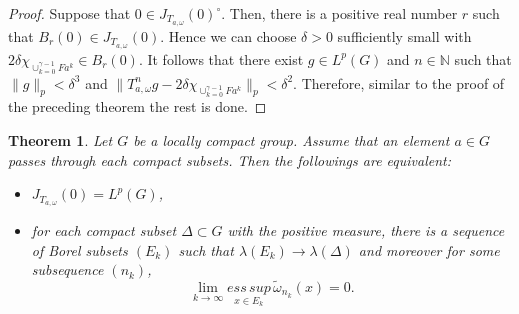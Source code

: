 \documentclass{amsart}
\newtheorem{thm}{Theorem}[section]
\theoremstyle{definition}\newtheorem{defn}[thm]{Definition}
\theoremstyle{remark}
\numberwithin{equation}{section}
\begin{document}
\begin{proof}
Suppose that  $0\in J_{T_{a,\omega}}(0)^\circ$. Then, there is a
positive real number $r$ such that $B_{r}(0)\in
J_{T_{a,\omega}}(0)$. Hence we can choose $\delta>0$ sufficiently
small with $2\delta\chi_{\cup_{k=0}^{\gamma-1}Fa^k}\in B_{r}(0)$. It
follows that there exist $g\in L^p(G)$ and $n\in\mathbb{N}$ such
that $\|g\|_p<\delta^3$ and
$\|T^n_{a,\omega}g-2\delta\chi_{\cup_{k=0}^{\gamma-1}Fa^k}\|_p<\delta^2$.
Therefore, similar to the proof of the preceding theorem the rest is
done.
\end{proof}
\begin{thm}\label{t3}
Let $G$ be a  locally compact group. Assume that  an element $a\in
G$ passes through  each compact subsets.  Then the followings are
equivalent:
\begin{itemize}
  \item [(i)] $J_{T_{a,\omega}}(0)=L^p(G)$,
  \item [(ii)] for each compact subset $\Delta
\subset G$ with the positive measure,
  there is a sequence of Borel subsets $(E_k)$ such
that $\lambda(E_k)\to\lambda(\Delta)$ and moreover for some
subsequence $(n_k)$,
$$
\lim_{k\rightarrow \infty}\underset{x\in E_{k}}{ess\,sup}\,
\tilde{\omega}_{n_k}(x)=0.
$$
\end{itemize}
\end{thm}
\end{document}
